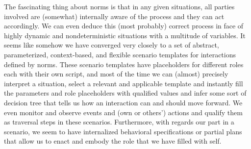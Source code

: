 The fascinating thing about norms is that in any given situations, all parties involved are (somewhat) internally aware of the process and they can act accordingly. We can even deduce this (most probably) correct process in face of highly dynamic and nondeterministic situations with a multitude of variables. It seems like somehow we have converged very closely to a set of abstract, parameterized, context-based, and flexible scenario templates for interactions defined by norms. These scenario templates have placeholders for different roles each with their own script, and most of the time we can (almost) precisely interpret a situation, select a relevant and applicable template and instantly fill the parameters and role placeholders with qualified values and infer some sort of decision tree that tells us how an interaction can and should move forward. We even monitor and observe events and (own or others') actions and qualify them as traversal steps in these scenarios. Furthermore, with regards our part in a scenario, we seem to have internalized behavioral specifications or partial plans that allow us to enact and embody the role that we have filled with self.


